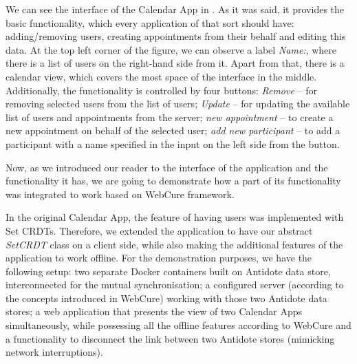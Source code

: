 We can see the interface of the Calendar App in . As it was said, it provides the basic functionality, which every application of that sort should have: adding/removing users, creating appointments from their behalf and editing this data. At the top left corner of the figure, we can observe a label \textit{Name:}, where there is a list of users on the right-hand side from it. Apart from that, there is a calendar view, which covers the most space of the interface in the middle. Additionally, the functionality is controlled by four buttons: \textit{Remove} -- for removing selected users from the list of users; \textit{Update} -- for updating the available list of users and appointments from the server; \textit{new appointment} -- to create a new appointment on behalf of the selected user; \textit{add new participant} -- to add a participant with a name specified in the input on the left side from the button. 

Now, as we introduced our reader to the interface of the application and the functionality it has, we are going to demonstrate how a part of its functionality was integrated to work based on WebCure framework. 

In the original Calendar App, the feature of having users was implemented with Set CRDTs. Therefore, we extended the application to have our abstract \textit{SetCRDT} class on a client side, while also making the additional features of the application to work offline. For the demonstration purposes, we have the following setup: two separate Docker containers built on Antidote data store, interconnected for the mutual synchronisation; a configured server (according to the concepts introduced in WebCure) working with those two Antidote data stores; a web application that presents the view of two Calendar Apps simultaneously, while possessing all the offline features according to WebCure and a functionality to disconnect the link between two Antidote stores (mimicking network interruptions). 

